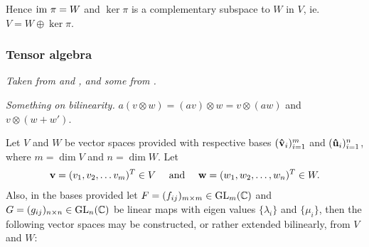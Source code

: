 	Hence $\text{im } \pi = W$ and $\ker \pi$ is a complementary subspace to $W$ in $V$, ie. $V  = W \oplus \ker \pi$.
		
	\subsubsection{Tensor algebra}\label{sect:tensoralgebra}
	
		\textit{Taken from \cite{Jeevanjee} and \cite{Yokonuma}, and some from \cite{Holst}.}
		
		\textit{Something on bilinearity.} $a(v\otimes w) = (av)\otimes w = v \otimes (aw)$ and $v \otimes (w + w')$.

		Let $V$ and $W$ be vector spaces provided with respective bases $(\mathbf{\hat{v}}_i)_{i=1}^m$ and $(\mathbf{\hat{u}}_i)_{i=1}^n$, where $m = \dim V$ and $n = \dim W$. Let \begin{align*}
			\mathbf{v} = (v_1, v_2, \dots v_m)^T \in V
		\quad \text{ and } \quad 
		\mathbf{w} = (w_1, w_2, \dots, w_n)^T \in W.
	\end{align*}
	Also, in the bases provided let $F=(f_{ij})_{m \times m} \in \text{GL}_m(\mathbb{C})$ and $G = (g_{ij})_{n \times n} \in \text{GL}_n(\mathbb{C})$ be linear maps with eigen values $\{\lambda_i\}$ and $\{\mu_i\}$, then the following vector spaces may be constructed, or rather extended bilinearly, from $V$ and $W$:
